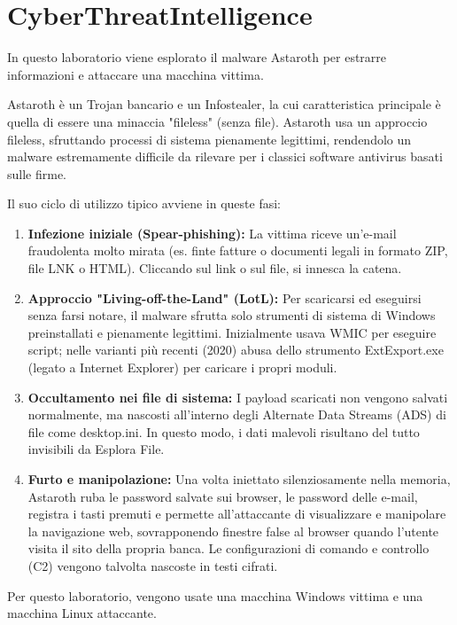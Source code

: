 \chapter{CyberThreatIntelligence}

In questo laboratorio viene esplorato il malware Astaroth per estrarre informazioni e attaccare una macchina vittima.

Astaroth è un Trojan bancario e un Infostealer, la cui caratteristica principale è quella di essere una minaccia "fileless" (senza file). Astaroth usa un approccio fileless, sfruttando processi di sistema pienamente legittimi, rendendolo un malware estremamente difficile da rilevare per i classici software antivirus basati sulle firme.

Il suo ciclo di utilizzo tipico avviene in queste fasi:
\begin{enumerate}
    \item \textbf{Infezione iniziale (Spear-phishing):} La vittima riceve un'e-mail fraudolenta molto mirata (es. finte fatture o documenti legali in formato ZIP, file LNK o HTML). Cliccando sul link o sul file, si innesca la catena.
    \item \textbf{Approccio "Living-off-the-Land" (LotL):} Per scaricarsi ed eseguirsi senza farsi notare, il malware sfrutta solo strumenti di sistema di Windows preinstallati e pienamente legittimi. Inizialmente usava WMIC per eseguire script; nelle varianti più recenti (2020) abusa dello strumento ExtExport.exe (legato a Internet Explorer) per caricare i propri moduli.
    \item \textbf{Occultamento nei file di sistema:} I payload scaricati non vengono salvati normalmente, ma nascosti all'interno degli Alternate Data Streams (ADS) di file come desktop.ini. In questo modo, i dati malevoli risultano del tutto invisibili da Esplora File.
    \item \textbf{Furto e manipolazione:} Una volta iniettato silenziosamente nella memoria, Astaroth ruba le password salvate sui browser, le password delle e-mail, registra i tasti premuti e permette all'attaccante di visualizzare e manipolare la navigazione web, sovrapponendo finestre false al browser quando l'utente visita il sito della propria banca. Le configurazioni di comando e controllo (C2) vengono talvolta nascoste in testi cifrati.
\end{enumerate}

Per questo laboratorio, vengono usate una macchina Windows vittima e una macchina Linux attaccante.

